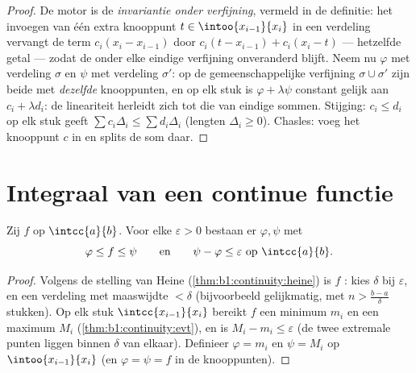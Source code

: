\begin{proof}
De motor is de \emph{invariantie onder verfijning}, vermeld in de
definitie: het invoegen van één extra knooppunt $t \in
\intoo{x_{i-1}}{x_i}$ in een verdeling vervangt de term $c_i(x_i -
x_{i-1})$ door $c_i(t - x_{i-1}) + c_i(x_i - t)$ --- hetzelfde
getal --- zodat de  onder elke eindige verfijning
onveranderd blijft. Neem nu $\varphi$ met verdeling $\sigma$ en
$\psi$ met verdeling $\sigma'$: op de gemeenschappelijke
verfijning $\sigma \cup \sigma'$ zijn beide  met
\emph{dezelfde} knooppunten, en op elk stuk is $\varphi +
\lambda\psi$ constant gelijk aan $c_i + \lambda d_i$: de
lineariteit herleidt zich tot die van eindige sommen. Stijging:
$c_i \leq d_i$ op elk stuk geeft $\sum c_i \Delta_i \leq \sum d_i
\Delta_i$ (lengten $\Delta_i \geq 0$). Chasles: voeg het
knooppunt $c$ in en splits de som daar.
\end{proof}

\section{Integraal van een continue functie}

\begin{theorem}\label{thm:b1:integration:approx}
Zij $f$  op $\intcc{a}{b}$. Voor elke $\varepsilon > 0$
bestaan er  $\varphi, \psi$ met
\[
\varphi \leq f \leq \psi
\qquad\text{en}\qquad
\psi - \varphi \leq \varepsilon \text{ op } \intcc{a}{b}.
\]
\end{theorem}

\begin{proof}
Volgens de stelling van Heine (\cref{thm:b1:continuity:heine}) is $f$
: kies $\delta$ bij $\varepsilon$, en een verdeling
met maaswijdte $< \delta$ (bijvoorbeeld gelijkmatig, met $n >
\frac{b - a}{\delta}$ stukken). Op elk  stuk
$\intcc{x_{i-1}}{x_i}$ bereikt $f$ een minimum $m_i$ en een maximum
$M_i$ (\cref{thm:b1:continuity:evt}), en is $M_i - m_i \leq
\varepsilon$ (de twee extremale punten liggen binnen $\delta$ van
elkaar). Definieer $\varphi = m_i$ en $\psi = M_i$ op
$\intoo{x_{i-1}}{x_i}$ (en $\varphi = \psi = f$ in de knooppunten).
\end{proof}

